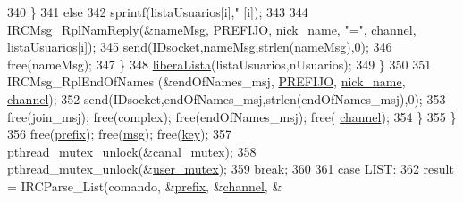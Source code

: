 \begin{DoxyCode}
{{{340                                                         \}
341                                                         \textcolor{keywordflow}{else}
342                                                                 sprintf(listaUsuarios[i],\textcolor{stringliteral}{"%
      [i]);
343 
344                                                         IRCMsg\_RplNamReply(&nameMsg,
      \hyperlink{_g-2361-06-_p1-_server_8h_a78c658ff923693099f7b621e7c351129}{PREFIJO}, \hyperlink{_g-2361-06-_p1-_server_8c_aabbf66718cda228b924a4a9441eadf62}{nick\_name}, \textcolor{stringliteral}{"="}, \hyperlink{_g-2361-06-_p1-_server_8c_a842ca2f026578e5c479c095ff3335969}{channel}, listaUsuarios[i]);
345                                                         send(IDsocket,nameMsg,strlen(nameMsg),0);
346                                                         free(nameMsg); 
347                                                 \}       
348                                                 \hyperlink{_g-2361-06-_p1-_functions_8h_a5fa63429b3483f20a469c23625c96820}{liberaLista}(listaUsuarios,nUsuarios);                        
349                                         \}       
350 
351                                         IRCMsg\_RplEndOfNames (&endOfNames\_msj, 
      \hyperlink{_g-2361-06-_p1-_server_8h_a78c658ff923693099f7b621e7c351129}{PREFIJO}, \hyperlink{_g-2361-06-_p1-_server_8c_aabbf66718cda228b924a4a9441eadf62}{nick\_name}, \hyperlink{_g-2361-06-_p1-_server_8c_a842ca2f026578e5c479c095ff3335969}{channel});
352                                         send(IDsocket,endOfNames\_msj,strlen(endOfNames\_msj),0);
353                                         free(join\_msj); free(complex); free(endOfNames\_msj); free(
      \hyperlink{_g-2361-06-_p1-_server_8c_a842ca2f026578e5c479c095ff3335969}{channel});
354                                 \}
355                         \}
356                         free(\hyperlink{_g-2361-06-_p1-_server_8c_ad2849cf781a4db22cc1b31eaaee50a4f}{prefix}); free(\hyperlink{_g-2361-06-_p1-_server_8c_a32d2f5216cddb59c7cc8fb2806a7e727}{msg}); free(\hyperlink{_g-2361-06-_p1-_server_8c_a5892a9181e6a332f84d27aecd41dcd12}{key});
357                         pthread\_mutex\_unlock(&\hyperlink{_g-2361-06-_p1-_server_8c_ab86a544a49de18195048bac54dd3ac3e}{canal\_mutex});
358                         pthread\_mutex\_unlock(&\hyperlink{_g-2361-06-_p1-_server_8c_a5dedd07a1144d2ab70b74a8e64b6a7c0}{user\_mutex});
359                         \textcolor{keywordflow}{break};
360 
361                 \textcolor{keywordflow}{case} LIST:
362                         result = IRCParse\_List(comando, &\hyperlink{_g-2361-06-_p1-_server_8c_ad2849cf781a4db22cc1b31eaaee50a4f}{prefix}, &\hyperlink{_g-2361-06-_p1-_server_8c_a842ca2f026578e5c479c095ff3335969}{channel}, &
}}}}
\end{DoxyCode}
